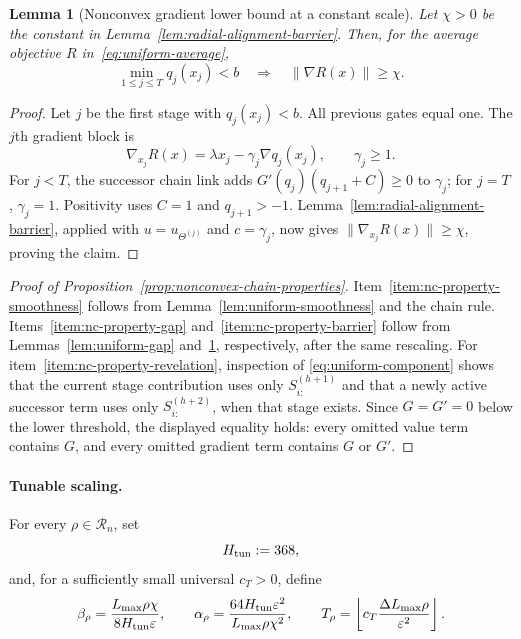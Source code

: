 \documentclass{article}
\newtheorem{lemma}[theorem]{Lemma}
\theoremstyle{definition}
\begin{document}
\begin{lemma}[Nonconvex gradient lower bound at a constant scale]
\label{lem:radial-barrier}
Let $\chi>0$ be the constant in
Lemma~\ref{lem:radial-alignment-barrier}.  Then, for the average objective
$R$ in~\eqref{eq:uniform-average},
\begin{equation}
 \min_{1\le j\le T}q_j(x_j)<b
 \quad\Longrightarrow\quad
 \|\nabla R(x)\|\ge\chi.
 \label{eq:radial-barrier}
\end{equation}
\end{lemma}

\begin{proof}
Let $j$ be the first stage with $q_j(x_j)<b$.  All previous gates equal one.
The $j$th gradient block is
\begin{equation}
 \nabla_{x_j}R(x)
 =\lambda x_j-\gamma_j\nabla q_j(x_j),
 \qquad \gamma_j\ge1.
 \label{eq:radial-block-field}
\end{equation}
For $j<T$, the successor chain link adds
$G'(q_j)(q_{j+1}+C)\ge0$ to $\gamma_j$; for $j=T$,
$\gamma_j=1$.  Positivity uses $C=1$ and $q_{j+1}>-1$.
Lemma~\ref{lem:radial-alignment-barrier}, applied with
$u=u_{\Theta^{(j)}}$ and $c=\gamma_j$, now gives
$\|\nabla_{x_j}R(x)\|\ge\chi$, proving the claim.
\end{proof}

\begin{proof}[Proof of Proposition~\ref{prop:nonconvex-chain-properties}]
Item~\ref{item:nc-property-smoothness} follows from
Lemma~\ref{lem:uniform-smoothness} and the chain rule.
Items~\ref{item:nc-property-gap} and~\ref{item:nc-property-barrier} follow from
Lemmas~\ref{lem:uniform-gap} and~\ref{lem:radial-barrier}, respectively, after
the same rescaling.  For item~\ref{item:nc-property-revelation}, inspection of
\eqref{eq:uniform-component} shows that the current stage contribution uses only
$S^{(h+1)}_{i:}$ and that a newly active successor term uses only
$S^{(h+2)}_{i:}$, when that stage exists.  Since $G=G'=0$ below the lower
threshold, the displayed equality holds: every omitted value term contains
$G$, and every omitted gradient term contains $G$ or $G'$.
\end{proof}

\paragraph{Tunable scaling.}
For every $\rho\in\mathcal R_n$, set
\begin{equation}
 H_{\rm tun}:=368,
 \label{eq:tunable-component-H}
\end{equation}
and, for a sufficiently small universal $c_T>0$, define
\begin{equation}
 \beta_\rho=\frac{L_{\max}\rho\chi}{8H_{\rm tun}\varepsilon},
 \qquad
 \alpha_\rho=\frac{64H_{\rm tun}\varepsilon^2}
 {L_{\max}\rho\chi^2},
 \qquad
 T_\rho=\left\lfloor
 c_T\frac{\Delta L_{\max}\rho}{\varepsilon^2}
 \right\rfloor.
 \label{eq:tunable-analytic-parameters}
\end{equation}
\end{document}
